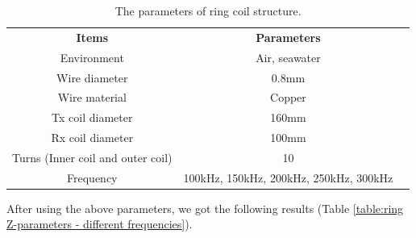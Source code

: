 \begin{table}[htbp]
    \centering
    \caption{The parameters of ring coil structure.}
    \begin{tabular}{ c|cc }
        \thickhline
        \textbf{Items}                    & \textbf{Parameters}                    \\
        \thickhline
        Environment                       & Air, seawater                          \\ \hline
        Wire diameter                     & 0.8mm                                  \\ \hline
        Wire material                     & Copper                                 \\
        \hline
        Tx coil diameter                  & 160mm                                  \\ \hline
        Rx coil diameter                  & 100mm                                  \\ \hline
        Turns (Inner coil and outer coil) & 10                                     \\ \hline
        Frequency                         & 100kHz, 150kHz, 200kHz, 250kHz, 300kHz \\ \hline
    \end{tabular}
    \label{table:ring coil parameters - different frequencies}
\end{table}

After using the above parameters, we got the following results (Table \ref{table:ring Z-parameters - different frequencies}).

